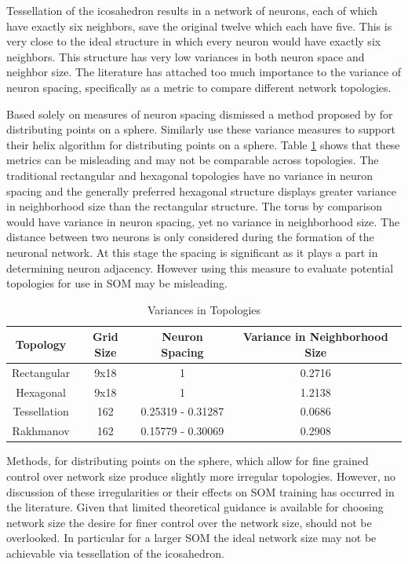 \documentclass[11pt]{article}
\begin{document}
Tessellation of the icosahedron results in a network of neurons, each of which
have exactly six neighbors, save the original twelve which each have five.
This is very close to the ideal structure in which every neuron would have
exactly six neighbors.  This structure has very low variances in both neuron 
space and neighbor size.  The literature has attached too much importance 
to the variance of neuron spacing, specifically as a metric to compare different 
network topologies.  

Based solely on measures of neuron spacing \cite{wu2005} dismissed a method
proposed by \cite{Rakhmanov94} for distributing points on a sphere.  Similarly 
\cite{Nishio:2006fk} use these variance measures to support their helix algorithm 
for distributing points on a sphere.  Table \ref{table1} shows that these metrics can 
be misleading and may not be comparable across topologies.  The traditional 
rectangular and hexagonal topologies have no variance in neuron spacing and 
the generally preferred hexagonal structure displays greater variance in neighborhood
size than the rectangular structure.  The torus by comparison would have variance in 
neuron spacing, yet no variance in neighborhood size.  The distance between two 
neurons is only considered during the formation of the neuronal network.  At this stage
the spacing is significant as it plays a part in determining neuron adjacency. However 
using this measure to evaluate potential topologies for use in SOM may be misleading.

\begin{table}[htbp]
\caption{Variances in Topologies}
\begin{center}
\begin{tabular}{|c|c|c|c|}
\hline
Topology&Grid Size&Neuron Spacing&Variance in Neighborhood Size\\
\hline
Rectangular&9x18&1&0.2716\\
Hexagonal&9x18&1&1.2138\\
Tessellation&162&0.25319 - 0.31287& 0.0686\\
Rakhmanov&162&0.15779 - 0.30069& 0.2908\\
\hline

\end{tabular}
\end{center}
\label{table1}
\end{table}%

Methods, for distributing points on the sphere, which allow for fine grained
control over network size produce slightly more irregular topologies.  However,
no discussion of these irregularities or their effects on SOM training has
occurred in the literature. Given that limited theoretical guidance is available
for choosing network size the desire for finer control over the network size,
should not be overlooked. In particular for a larger SOM the ideal network size
may not be achievable via tessellation of the icosahedron.
\end{document}
